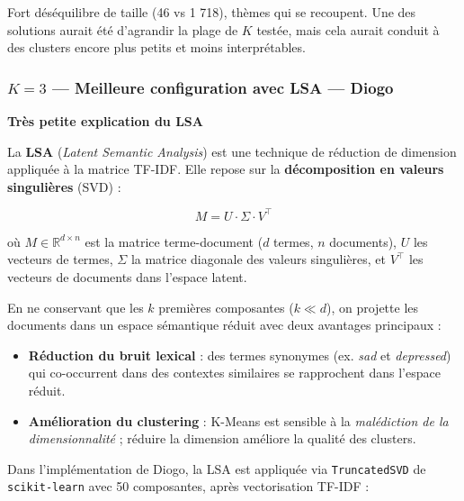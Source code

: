 \documentclass[12pt,a4paper]{report}
\begin{document}
\begin{warn}
Fort déséquilibre de taille (46 vs 1 718), thèmes qui se recoupent.
Une des solutions aurait été d'agrandir la plage de $K$ testée, mais cela aurait conduit à des clusters encore plus petits et moins interprétables.
\end{warn}

\pagebreak

\subsubsection*{$K = 3$ — Meilleure configuration avec LSA — Diogo}

\textbf{Très petite explication du LSA}

La \textbf{LSA} (\textit{Latent Semantic Analysis}) est une technique de réduction de
dimension appliquée à la matrice TF-IDF. Elle repose sur la \textbf{décomposition en
valeurs singulières} (SVD) :

$$M = U \cdot \Sigma \cdot V^\top$$

où $M \in \mathbb{R}^{d \times n}$ est la matrice terme-document ($d$ termes, $n$ documents),
$U$ les vecteurs de termes, $\Sigma$ la matrice diagonale des valeurs singulières, et $V^\top$
les vecteurs de documents dans l'espace latent.

En ne conservant que les $k$ premières composantes ($k \ll d$), on projette les documents
dans un espace sémantique réduit avec deux avantages principaux :

\begin{itemize}
  \item \textbf{Réduction du bruit lexical} : des termes synonymes (ex. \textit{sad} et
        \textit{depressed}) qui co-occurrent dans des contextes similaires se rapprochent
        dans l'espace réduit.
  \item \textbf{Amélioration du clustering} : K-Means est sensible à la \textit{malédiction
        de la dimensionnalité} ; réduire la dimension améliore la qualité des clusters.
\end{itemize}

Dans l'implémentation de Diogo, la LSA est appliquée via \texttt{TruncatedSVD} de
\texttt{scikit-learn} avec 50 composantes, après vectorisation TF-IDF :
\end{document}

